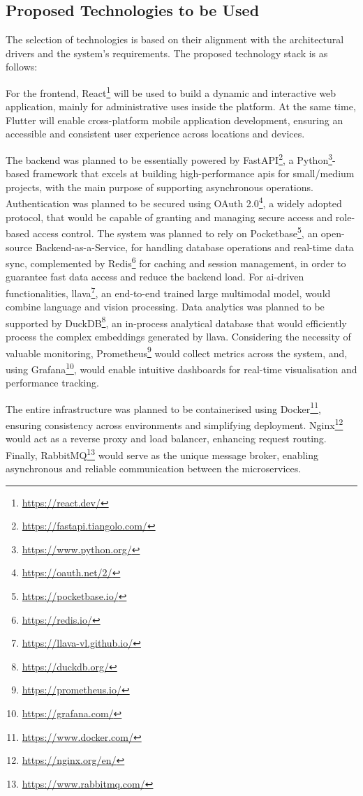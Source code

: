 
\subsection{Proposed Technologies to be Used}

The selection of technologies is based on their alignment with the architectural drivers and the system's requirements. The proposed technology stack is as follows:

For the frontend, React\footnote{\url{https://react.dev/}} will be used to build a dynamic and interactive web application, mainly for administrative uses inside the platform. At the same time, Flutter will enable cross-platform mobile application development, ensuring an accessible and consistent user experience across locations and devices.

The backend was planned to be essentially powered by FastAPI\footnote{\url{https://fastapi.tiangolo.com/}}, a Python\footnote{\url{https://www.python.org/}}-based framework that excels at building high-performance \acp{api} for small/medium projects, with the main purpose of supporting asynchronous operations. Authentication was planned to be secured using OAuth 2.0\footnote{\url{https://oauth.net/2/}}, a widely adopted protocol, that would be capable of granting and managing secure access and role-based access control. The system was planned to rely on Pocketbase\footnote{\url{https://pocketbase.io/}}, an open-source Backend-as-a-Service, for handling database operations and real-time data sync, complemented by Redis\footnote{\url{https://redis.io/}} for caching and session management, in order to guarantee fast data access and reduce the backend load. For \ac{ai}-driven functionalities, \ac{llava}\footnote{\url{https://llava-vl.github.io/}}, an end-to-end trained large multimodal model, would combine language and vision processing. Data analytics was planned to be supported by DuckDB\footnote{\url{https://duckdb.org/}}, an in-process analytical database that would efficiently process the complex embeddings generated by \ac{llava}. Considering the necessity of valuable monitoring, Prometheus\footnote{\url{https://prometheus.io/}} would collect metrics across the system, and, using Grafana\footnote{\url{https://grafana.com/}}, would enable intuitive dashboards for real-time visualisation and performance tracking. 

The entire infrastructure was planned to be containerised using Docker\footnote{\url{https://www.docker.com/}}, ensuring consistency across environments and simplifying deployment. Nginx\footnote{\url{https://nginx.org/en/}} would act as a reverse proxy and load balancer, enhancing request routing. Finally, RabbitMQ\footnote{\url{https://www.rabbitmq.com/}} would serve as the unique message broker, enabling asynchronous and reliable communication between the microservices.

